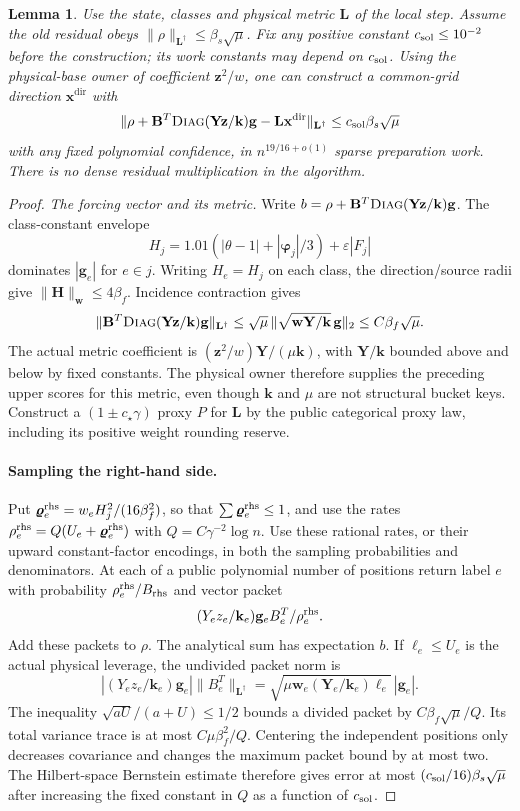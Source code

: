 \documentclass[11pt]{article}
\newtheorem{lemma}[theorem]{Lemma}
\theoremstyle{remark}
\newcommand{\BB}{\mathbf B}
\newcommand{\HH}{\mathbf H}
\newcommand{\LL}{\mathbf L}
\newcommand{\ww}{\mathbf w}
\newcommand{\zz}{\mathbf z}
\newcommand{\vvr}{\boldsymbol{\varrho}}
\newcommand{\xxdir}{\mathbf{x}^{\mathrm{dir}}}
\newcommand{\YY}{\mathbf Y}
\renewcommand{\gg}{\mathbf g}
\newcommand{\kk}{\mathbf k}
\newcommand{\pphi}{\boldsymbol{\varphi}}
\newcommand{\diag}{\textsc{Diag}}
\newcommand{\norm}[1]{\lVert#1\rVert}
\begin{document}
\begin{lemma}
\label{lem:ram27-physical-solve}
Use the state, classes and physical metric $\LL$ of the local step.
Assume the old residual obeys $\norm{\rho}_{\LL^\dagger}\le\beta_s\sqrt\mu$.
Fix any positive constant $c_{\rm sol}\le10^{-2}$ before the construction; its
work constants may depend on $c_{\rm sol}$.
Using the physical-base owner of coefficient $\zz^2/w$, one can construct a
common-grid direction $\xxdir$ with
\[
 \norm{\rho+\BB^T\diag(\YY\zz/\kk)\gg-\LL \xxdir
                       }_{\LL^\dagger}
                  \le c_{\rm sol}\beta_s\sqrt\mu
\]
with any fixed polynomial confidence, in $n^{19/16+o(1)}$ sparse
preparation work.
There is no dense residual multiplication in the algorithm.
\end{lemma} \begin{proof} \emph{The forcing vector and its metric.} Write
$b=\rho+\BB^T\diag(\YY\zz/\kk)\gg$.
The class-constant envelope
\[
 H_j=1.01(|\theta-1|+|\pphi_j|/3)+\varepsilon|F_j|
\]
dominates $|\gg_e|$ for $e\in j$.
Writing $H_e=H_j$ on each class, the direction/source radii give
$\norm{\HH}_{\ww}\le4\beta_f$.
Incidence contraction gives
\[
 \norm{\BB^T\diag(\YY\zz/\kk)\gg}_{\LL^\dagger}
 \le\sqrt\mu\,\norm{\sqrt{\ww\YY/\kk}\,\gg}_2
 \le C\beta_f\sqrt\mu.
\]
The actual metric coefficient is $(\zz^2/w)\YY/(\mu \kk)$, with $\YY/\kk$ bounded above
and below by fixed constants.
The physical owner therefore supplies the preceding upper scores for this
metric, even though $\kk$ and $\mu$ are not structural bucket keys.
Construct a $(1\pm c_\star\gamma)$ proxy $P$ for $\LL$ by the public categorical proxy
law, including its positive weight rounding reserve.

\paragraph{Sampling the right-hand side.}
Put $\vvr_e^{\rm rhs}=w_eH_j^2/(16\beta_f^2)$, so that $\sum \vvr_e^{\rm rhs}\le1$,
and use the rates $\rho_e^{\rm rhs}=Q(U_e+\vvr_e^{\rm rhs})$ with
$Q=C\gamma^{-2}\log n$.
Use these rational rates, or their upward constant-factor encodings, in both the
sampling probabilities and denominators.
At each of a public polynomial number of positions return label $e$ with
probability $\rho_e^{\rm rhs}/B_{\rm rhs}$ and vector packet
\[
      (Y_ez_e/\kk_e)\gg_e B_e^T/\rho_e^{\rm rhs}.
\]
Add these packets to $\rho$.
The analytical sum has expectation $b$.
If $\ell_e\le U_e$ is the actual physical leverage, the undivided packet norm is
\[
 |(Y_ez_e/\kk_e)\gg_e|\norm{B_e^T}_{\LL^\dagger}
       =\sqrt{\mu \ww_e(\YY_e/\kk_e)\ell_e}\,|\gg_e|.
\]
The inequality $\sqrt{aU}/(a+U)\le1/2$ bounds a divided packet by
$C\beta_f\sqrt\mu/Q$.
Its total variance trace is at most $C\mu\beta_f^2/Q$.
Centering the independent positions only decreases covariance and changes the
maximum packet bound by at most two.
The Hilbert-space Bernstein estimate therefore gives error at most $(c_{\rm
sol}/16)\beta_s\sqrt\mu$ after increasing the fixed constant in $Q$ as a
function of $c_{\rm sol}$.


\end{proof}
\end{document}
